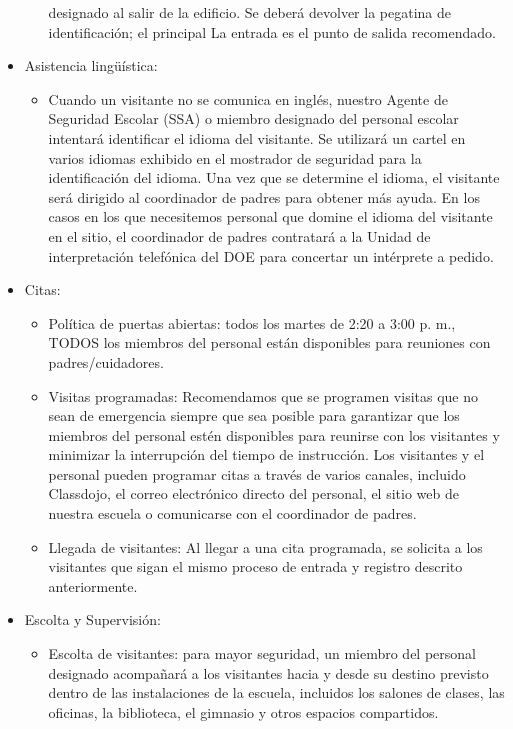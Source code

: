 \documentclass[12pt,letterpaper]{article}
\begin{document}
\begin{itemize}
\begin{itemize}
		designado al salir de la edificio. Se deberá devolver la pegatina de 
		identificación; el principal La entrada es el punto de salida 
		recomendado.
		\end{itemize}
	\item Asistencia lingüística:
		\begin{itemize}
		\item Cuando un visitante no se comunica en inglés, nuestro Agente de Seguridad Escolar (SSA) o miembro designado del personal escolar intentará identificar el idioma del visitante. Se utilizará un cartel en varios idiomas exhibido en el mostrador de seguridad para la identificación del idioma. Una vez que se determine el idioma, el visitante será dirigido al coordinador de padres para obtener más ayuda. En los casos en los que necesitemos personal que domine el idioma del
\pagebreak
\vspace*{1.5cm}
visitante en el sitio, el coordinador de padres contratará a la Unidad de interpretación telefónica del DOE para concertar un intérprete a pedido.
		\end{itemize}
	\item Citas:
		\begin{itemize}
		\item Política de puertas abiertas: todos los martes de 2:20 a 3:00 p. m., TODOS los miembros del personal están disponibles para reuniones con padres/cuidadores.
		\item Visitas programadas: Recomendamos que se programen visitas que no sean de emergencia siempre que sea posible para garantizar que los miembros del personal estén disponibles para reunirse con los visitantes y minimizar la interrupción del tiempo de instrucción. Los visitantes y el personal pueden programar citas a través de varios canales, incluido Classdojo, el correo electrónico directo del personal, el sitio web de nuestra escuela o comunicarse con el coordinador de padres.
		\item Llegada de visitantes: Al llegar a una cita programada, se solicita a los visitantes que sigan el mismo proceso de entrada y registro descrito anteriormente.
		\end{itemize}
	\item Escolta y Supervisión:
		\begin{itemize}
		\item Escolta de visitantes: para mayor seguridad, un miembro del personal designado acompañará a los visitantes hacia y desde su destino previsto dentro de las instalaciones de la escuela, incluidos los salones de clases, las oficinas, la biblioteca, el gimnasio y otros espacios compartidos.

\end{itemize}
\end{itemize}
\end{document}

